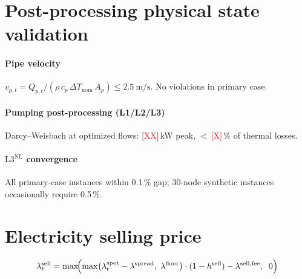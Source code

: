\documentclass[review,3p]{elsarticle}
\newcommand{\placeholder}[1]{\textcolor{red}{[#1]}}
\newcommand{\Lnl}{\mathrm{L3}^{\mathrm{NL}}}
\begin{document}
\section{Post-processing physical state validation}
\label{app:state_validation}

\paragraph{Pipe velocity}
$v_{p,t} = Q_{p,t} / (\rho\, c_p\, \Delta T_{\mathrm{nom}}\, A_p)
\leq \SI{2.5}{\metre\per\second}$. No violations in primary case.

\paragraph{Pumping post-processing (L1/L2/L3)}
Darcy--Weisbach at optimized flows: \placeholder{XX}\,kW peak,
${<}\,$\placeholder{X}\,\% of thermal losses.

\paragraph{$\Lnl$ convergence}
All primary-case instances within 0.1\,\% gap; 30-node synthetic
instances occasionally require 0.5\,\%.

\section{Electricity selling price}
\label{app:selling_price}

\begin{equation}
  \lambda_t^{\mathrm{sell}} = \max\!\Bigl(
    \max\bigl(\lambda_t^{\mathrm{spot}}
      - \lambda^{\mathrm{spread}},\;
      \lambda^{\mathrm{floor}}\bigr)
    \cdot (1 - h^{\mathrm{sell}})
    - \lambda^{\mathrm{sell,fee}},\;\; 0\Bigr)
\end{equation}
\end{document}
